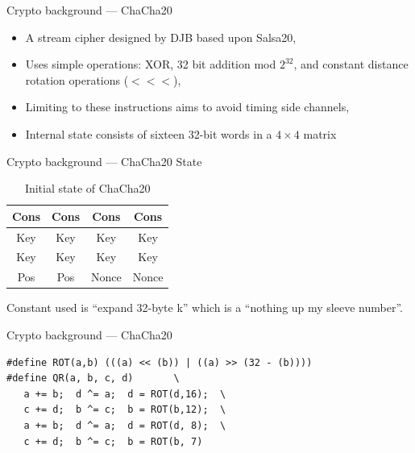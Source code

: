 \documentclass[xcolor=table]{beamer}
\begin{document}
    \begin{frame}{Crypto background --- ChaCha20}
        \begin{itemize}
            \item A stream cipher designed by DJB based upon Salsa20,
            \item Uses simple operations: XOR, 32 bit addition mod \(2^{32}\), and constant distance rotation operations (\(<<<\)),
            \item Limiting to these instructions aims to avoid timing side channels,
            \item Internal state consists of sixteen 32-bit words in a \(4 \times 4\) matrix
        \end{itemize}
    \end{frame}

    \begin{frame}{Crypto background --- ChaCha20 State}
        \begin{table}
        \begin{tabular}{|c|c|c|c|}
            \hline
            \rowcolor{yellow!25}Cons & Cons & Cons& Cons\\
            \hline
            \rowcolor{blue!25} Key & Key & Key & Key\\
            \hline
            \rowcolor{blue!25} Key & Key & Key & Key\\
            \hline
            \cellcolor{red!25} Pos & \cellcolor{red!25} Pos & \cellcolor{green!25} Nonce & \cellcolor{green!25} Nonce\\
            \hline
        \end{tabular}
        \caption{Initial state of ChaCha20}
        \end{table}

        Constant used is ``expand 32-byte k'' which is a ``nothing up my sleeve number''.
    \end{frame}

    \begin{frame}[fragile]{Crypto background --- ChaCha20}
        \begin{verbatim}
#define ROT(a,b) (((a) << (b)) | ((a) >> (32 - (b))))
#define QR(a, b, c, d)       \
   a += b;  d ^= a;  d = ROT(d,16);  \
   c += d;  b ^= c;  b = ROT(b,12);  \
   a += b;  d ^= a;  d = ROT(d, 8);  \
   c += d;  b ^= c;  b = ROT(b, 7)
        \end{verbatim}
    \end{frame}
\end{document}
